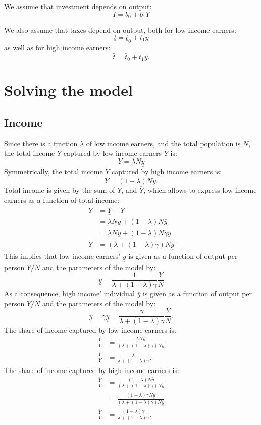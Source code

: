 \documentclass[]{book}
\theoremstyle{definition}
\theoremstyle{definition}
\theoremstyle{definition}
\theoremstyle{remark}
\begin{document}
We assume that investment depends on output: \[I=b_{0}+b_{1}Y\]

We also assume that taxes depend on output, both for low income earners:
\[\underline{t}=\underline{t}_{0}+t_1\underline{y}\] as well as for high
income earners: \[\bar{t}=\bar{t}_{0}+t_1\bar{y}.\]

\section{Solving the model}\label{solving-the-model}

\subsection{Income}\label{income}

Since there is a fraction \(\lambda\) of low income earners, and the
total population is \(N\), the total income \(\underline{Y}\) captured
by low income earners \(\underline{Y}\) is:
\[\underline{Y} = \lambda N \underline y\] Symmetrically, the total
income \(\bar{Y}\) captured by high income earners is:
\[\bar{Y}=(1-\lambda)N \bar{y}.\] Total income is given by the sum of
\(\underline{Y}\), and \(\bar{Y}\), which allows to express low income
earners as a function of total income: \[
\begin{aligned}
Y&=\underline{Y} + \bar{Y}\\
&=\lambda N \underline{y}+(1-\lambda) N \bar{y}\\
&=\lambda N \underline{y}+(1-\lambda) N \gamma\underline{y}\\
Y&=\left(\lambda +(1-\lambda)\gamma\right)N\underline{y}
\end{aligned}
\] This implies that low income earners' \(\underline{y}\) is given as a
function of output per person \(Y/N\) and the parameters of the model
by: \[\underline{y}=\frac{1}{\lambda+(1-\lambda)\gamma}\frac{Y}{N}\] As
a consequence, high income' individual \(\bar{y}\) is given as a
function of output per person \(Y/N\) and the parameters of the model
by:
\[\bar{y}=\gamma\underline{y}=\frac{\gamma}{\lambda+(1-\lambda)\gamma}\frac{Y}{N}.\]
The share of income captured by low income earners is: \[
\begin{aligned}
\frac{\underline{Y}}{Y}&=\frac{\lambda N \underline{y}}{\left(\lambda +(1-\lambda)\gamma\right)N\underline{y}}\\
\frac{\underline{Y}}{Y}&=\frac{\lambda}{\lambda +(1-\lambda)\gamma}.
\end{aligned}
\] The share of income captured by high income earners is: \[
\begin{aligned}
\frac{\bar{Y}}{Y}&=\frac{(1-\lambda) N \bar{y}}{\left(\lambda +(1-\lambda)\gamma\right)N\underline{y}}\\
&=\frac{(1-\lambda)\gamma N \underline{y}}{\left(\lambda +(1-\lambda)\gamma\right)N\underline{y}}\\
\frac{\bar{Y}}{Y}&=\frac{(1-\lambda)\gamma}{\lambda +(1-\lambda)\gamma}.
\end{aligned}
\]
\end{document}
